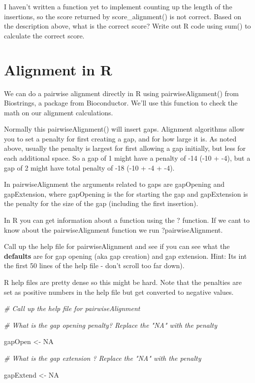 \documentclass[
]{book}
\newenvironment{Shaded}{\begin{snugshade}}{\end{snugshade}}
\newcommand{\CommentTok}[1]{\textcolor[rgb]{0.56,0.35,0.01}{\textit{#1}}}
\newcommand{\ConstantTok}[1]{\textcolor[rgb]{0.00,0.00,0.00}{#1}}
\newcommand{\NormalTok}[1]{#1}
\newcommand{\OtherTok}[1]{\textcolor[rgb]{0.56,0.35,0.01}{#1}}
\begin{document}
I haven't written a function yet to implement counting up the length of the insertions, so the score returned by score\_alignment() is not correct. Based on the description above, what is the correct score? Write out R code using sum() to calculate the correct score.

\hypertarget{alignment-in-r}{%
\section{Alignment in R}\label{alignment-in-r}}

We can do a pairwise alignment directly in R using pairwiseAlignment() from Biostrings, a package from Bioconductor. We'll use this function to check the math on our alignment calculations.

Normally this pairwiseAlignment() will insert gaps. Alignment algorithms allow you to set a penalty for first creating a gap, and for how large it is. As noted above, usually the penalty is largest for first allowing a gap initially, but less for each additional space. So a gap of 1 might have a penalty of -14 (-10 + -4), but a gap of 2 might have total penalty of -18 (-10 + -4 + -4).

In pairwiseAlignment the arguments related to gaps are gapOpening and gapExtension, where gapOpening is the for starting the gap and gapExtension is the penalty for the size of the gap (including the first insertion).

In R you can get information about a function using the ? function. If we cant to know about the pairwiseAlignment function we run ?pairwiseAlignment.

Call up the help file for pairwiseAlignment and see if you can see what the \textbf{defaults} are for gap opening (aka gap creation) and gap extension. Hint: Its int the first 50 lines of the help file - don't scroll too far down).

R help files are pretty dense so this might be hard. Note that the penalties are set as positive numbers in the help file but get converted to negative values.

\begin{Shaded}
\begin{Highlighting}[]
\CommentTok{\# Call up the help file for pairwiseAlignment}

\CommentTok{\# What is the gap opening penalty? Replace the "NA" with the penalty}

\NormalTok{gapOpen }\OtherTok{\textless{}{-}} \ConstantTok{NA}


\CommentTok{\# What is the gap extension ? Replace the "NA" with the penalty}

\NormalTok{gapExtend }\OtherTok{\textless{}{-}} \ConstantTok{NA}
\end{Highlighting}
\end{Shaded}
\end{document}
